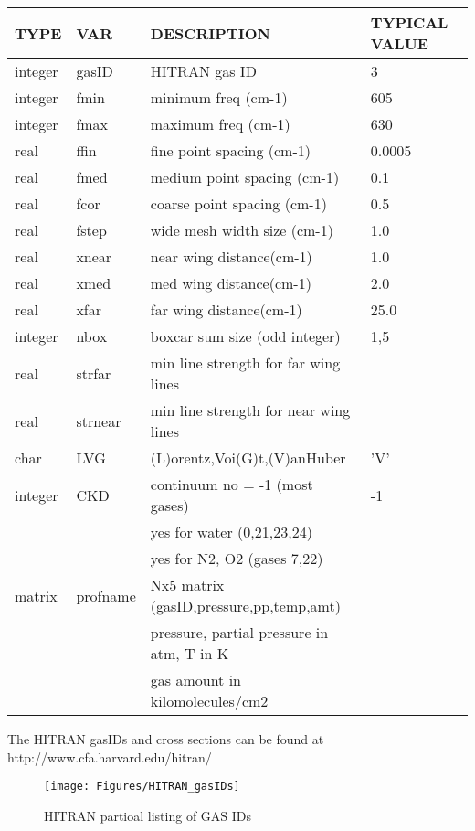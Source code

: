 \documentclass[11pt]{article}
\begin{document}
\begin{longtable}{llll}
\hline
\hline
  TYPE  &   VAR  &         DESCRIPTION  &            TYPICAL VALUE\\
\hline
\hline
integer & gasID  &       HITRAN gas ID      &            3\\
\hline
integer & fmin    &      minimum freq (cm-1) &          605\\
integer & fmax    &      maximum freq (cm-1) &          630\\
\hline
real   &  ffin    &      fine point spacing (cm-1) &    0.0005\\
real   &  fmed    &      medium point spacing (cm-1)&   0.1\\
real   &  fcor    &      coarse point spacing (cm-1)  & 0.5\\
\hline
real   &  fstep   &      wide mesh width size (cm-1) &    1.0\\
real   &  xnear   &      near wing distance(cm-1)    &    1.0\\
real   &  xmed    &      med wing distance(cm-1)     &    2.0\\
real   &  xfar    &      far wing distance(cm-1)     &    25.0\\
\hline
integer & nbox     &     boxcar sum size (odd integer) &  1,5\\
\hline
real   &  strfar   &    min line strength for far wing lines & \\
real   &  strnear  &    min line strength for near wing lines& \\
\hline
char   &  LVG       &    (L)orentz,Voi(G)t,(V)anHuber    &  'V'\\
\hline
integer&  CKD       &    continuum no  = -1 (most gases) &  -1\\
       &            &    yes for water (0,21,23,24)      &  \\
       &            &    yes for N2, O2 (gases 7,22)     &  \\
\hline
matrix & profname   & Nx5 matrix (gasID,pressure,pp,temp,amt)   & \\
       &            & pressure, partial pressure in atm, T in K & \\
       &            & gas amount in kilomolecules/cm2           & \\
\hline
\hline
\end{longtable}

The HITRAN gasIDs and cross sections can be found at 
http://www.cfa.harvard.edu/hitran/
\begin{figure}[h]
  \begin{center}\texttt{[image: Figures/HITRAN\_gasIDs]}\end{center}
  \caption{HITRAN partioal listing of GAS IDs}
  \label{fig:hitran}
\end{figure}
\end{document}
